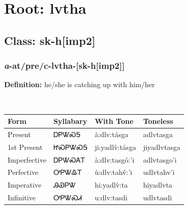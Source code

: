 \needspace{4in}
\section*{Root: lvtha}
\nopagebreak
{}
\needspace{3in}
\subsection*{Class: sk-h[imp2]}
\nopagebreak
\needspace{2in}
\subsubsection*{\textit{a}{-}at/pre/c{-}\textbf{lvtha}{-}[sk-h[imp2]]}
\nopagebreak
\textbf{Definition: } he/she is catching up with him/her
\\[0.5em]
\begin{tabularx}{\textwidth}{l X X X}%
\toprule%
\textbf{Form}&\textbf{Syllabary}&\textbf{With Tone}&\textbf{Toneless}\\%
\midrule%
Present&ᎠᏢᏔᏍᎦ&à:dlv:tásga&adlvtasga\\%
1st Present&ᏥᏍᏢᏔᏍᎦ&ji:yadlv̀:tásga&jiyadlvtasga\\%
Imperfective&ᎠᏢᏔᏍᎪᎢ&à:dlv:tasgó:’i&adlvtasgo’i\\%
Perfective&ᎤᏢᏔᎲᎢ&ù:dlv:tahv̌:’i&udlvtahv’i\\%
Imperative&ᎯᏯᏢᏔ&hi:yadlv̀:ta&hiyadlvta\\%
Infinitive&ᎤᏢᏔᏍᏗ&u:dlv:tasdi&udlvtasdi\\%
\bottomrule%
\end{tabularx}
\\[1em]